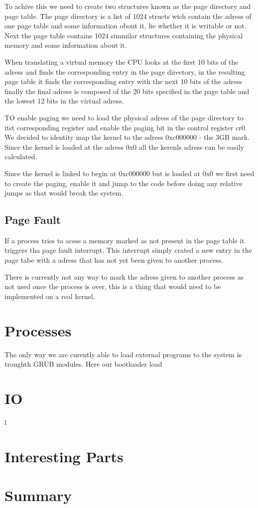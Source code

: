 \documentclass{article}
\begin{document}
To achive this we need to create two structures known as the page directory and page table. The page directory is a list of 1024 structs wich contain the adress of one page table and some information obout it, lie whether it is writable or not. Next the page table contains 1024 simmilar structures containing the physical memory and some information about it.

When translating a virtual memory the CPU looks at the first 10 bits of the adress and finds the corresponding entry in the page directory, in the resulting page table it finds the corresponding entry with the next 10 bits of the adress finally the final adress is composed of the 20 bits specified in the page table and the lowest 12 bits in the virtual adress.

TO enable paging we need to load the physical adress of the page directory to itst corresponding register and enable the paging bit in the control register cr0. We decided to identity map the kernel to the adress 0xc000000 - the 3GB mark. Since the kernel is loaded at the adress 0x0 all the kerenls adress can be easily calculated.

Since the kernel is linked to begin at 0xc000000 but is loaded at 0x0 we first need to create the paging, enable it and jump to the code before doing any relative jumps as that would break the system.

\subsection{Page Fault}
If a process tries to acess a memory marked as not present in the page table it triggers tha page fault interrupt. This interrupt simply crated a new entry in the page tabe with a adress that has not yet been given to another process. 

There is currently not any way to mark the adress given to another process as not used once the process is over, this is a thing that would need to be implemented on a real kernel. 
\section{Processes}
The only way we are curently able to load external programs to the system is troughth GRUB modules. Here our bootloader load 
\section{IO}l
\section{Interesting Parts}
\section{Summary}
\end{document}
